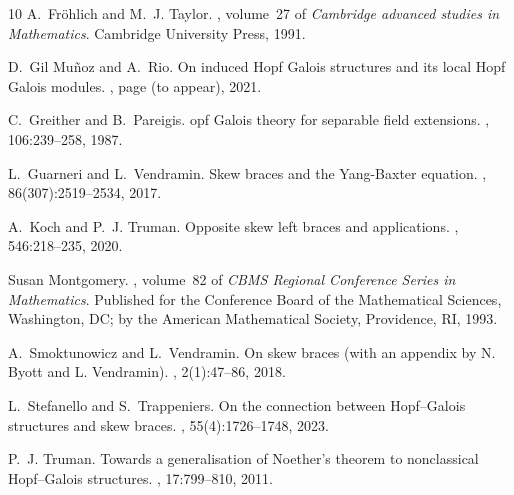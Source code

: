 \documentclass[12pt,a4paper, reqno]{amsart}
\theoremstyle{definition}
\begin{document}
\begin{thebibliography}{10}
A.~Fr\"{o}hlich and M.~J. Taylor.
, volume~27 of {\em Cambridge advanced
  studies in Mathematics}.
\newblock Cambridge University Press, 1991.

D.~{Gil Mu\~{n}oz} and A.~Rio.
\newblock On induced {H}opf {G}alois structures and its local {H}opf {G}alois
  modules.
, page (to appear), 2021.

C.~Greither and B.~Pareigis.
opf {G}alois theory for separable field extensions.
, 106:239--258, 1987.

L.~Guarneri and L.~Vendramin.
\newblock Skew braces and the {Y}ang-{B}axter equation.
, 86(307):2519--2534, 2017.

A.~Koch and P.~J. Truman.
\newblock Opposite skew left braces and applications.
, 546:218--235, 2020.

Susan Montgomery.
, volume~82 of {\em
  CBMS Regional Conference Series in Mathematics}.
\newblock Published for the Conference Board of the Mathematical Sciences,
  Washington, DC; by the American Mathematical Society, Providence, RI, 1993.

A.~Smoktunowicz and L.~Vendramin.
\newblock On skew braces (with an appendix by {N}. {B}yott and {L}.
  {V}endramin).
, 2(1):47--86, 2018.

L.~Stefanello and S.~Trappeniers.
\newblock On the connection between {H}opf--{G}alois structures and skew
  braces.
, 55(4):1726--1748, 2023.

P.~J. Truman.
\newblock Towards a generalisation of {N}oether's theorem to nonclassical
  {H}opf--{G}alois structures.
, 17:799--810, 2011.

\end{thebibliography}
\end{document}
